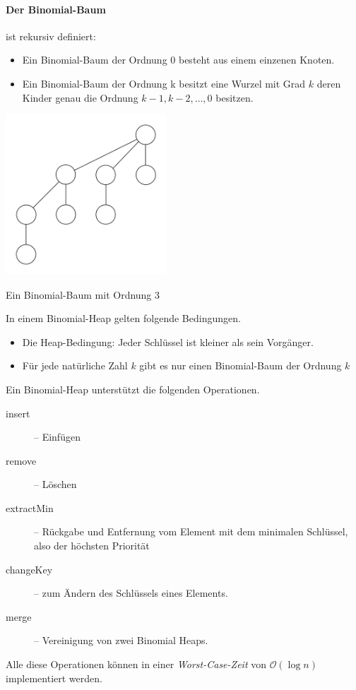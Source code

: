 \documentclass[a4paper, 9pt, DIV=20]{scrartcl}
\newcommand{\Oh}{\mathcal{O}}
\begin{document}
\paragraph{Der Binomial-Baum} ist rekursiv definiert:
\begin{itemize}
\item Ein Binomial-Baum der Ordnung 0 besteht aus einem einzenen Knoten.
\item Ein Binomial-Baum der Ordnung k besitzt eine Wurzel mit Grad $k$ deren Kinder genau die Ordnung $k-1, k-2, \dots, 0$ besitzen.
\end{itemize}
\begin{center}
\includegraphics[width=6cm]{BinomialTree3}

Ein Binomial-Baum mit Ordnung 3
\end{center}

In einem Binomial-Heap gelten folgende Bedingungen. \begin{itemize}
\item Die Heap-Bedingung: Jeder Schlüssel ist kleiner als sein Vorgänger.
\item Für jede natürliche Zahl $k$ gibt es nur einen Binomial-Baum der Ordnung $k$
\end{itemize}
Ein Binomial-Heap unterstützt die folgenden Operationen.
\begin{description}
\item[insert] -- Einfügen
\item[remove] -- Löschen
\item[extractMin] -- Rückgabe und Entfernung vom Element mit dem minimalen Schlüssel, also der höchsten Priorität
\item[changeKey] -- zum Ändern des Schlüssels eines Elements.
\item[merge] -- Vereinigung von zwei Binomial Heaps. 
\end{description}
Alle diese Operationen können in einer \emph{Worst-Case-Zeit} von $\Oh(\log{n})$ implementiert werden. 
\end{document}
